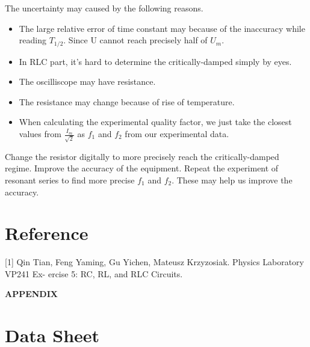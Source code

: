 \documentclass[12pt,a4paper]{article}
\begin{document}
The uncertainty may caused by the following reasons.
\begin{itemize}
    \item The large relative error of time constant may because of the inaccuracy while reading $T_{1/2}$. Since U cannot reach precisely half of $U_m$. 
	\item In RLC part, it's hard to determine the critically-damped simply by eyes.
	\item The oscilliscope may have resistance.
	\item The resistance may change because of rise of temperature.
	\item When calculating the experimental quality factor, we just take the closest values from $\frac{I_m}{\sqrt{2}}$ as $f_1$ and $f_2$ from our experimental data.
\end{itemize}

Change the resistor digitally to more precisely reach the critically-damped regime. Improve the accuracy of the equipment. Repeat the experiment of resonant series to find more precise $f_1$ and $f_2$. These may help us improve the accuracy.


\section{Reference} 
[1] Qin Tian, Feng Yaming, Gu Yichen, Mateusz Krzyzosiak. Physics Laboratory VP241 Ex-
ercise 5: RC, RL, and RLC Circuits.


\begin{description}
    \item[]   
\end{description}

{\LARGE\textbf{APPENDIX}}
\setcounter{section}{0}
\renewcommand\thesection{\Alph{section}}
\section{Data Sheet}
\end{document}
